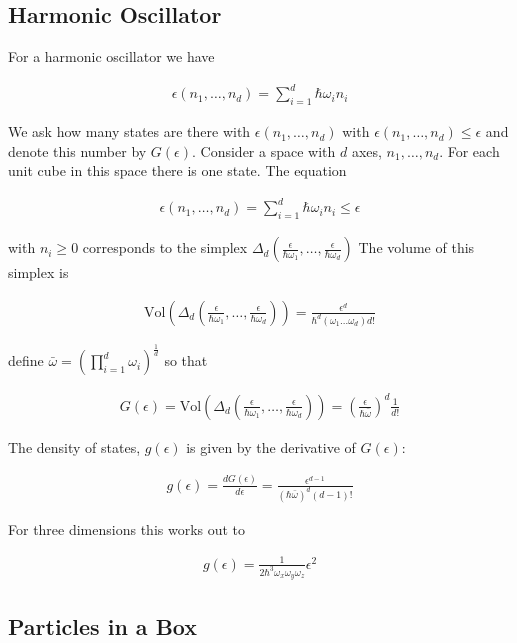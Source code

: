\documentclass[12pt]{article}
\newcommand{\ep}{\epsilon}
\begin{document}
\subsection{Harmonic Oscillator}
For a harmonic oscillator we have

\begin{align}
\ep(n_1,\ldots,n_d) = \sum_{i=1}^d \hbar \omega_i n_i
\end{align}

We ask how many states are there with $\ep(n_1, \ldots, n_d)$ with $\ep(n_1, \ldots, n_d) \le \ep$ and denote this number by $G(\ep)$. Consider a space with $d$ axes, $n_1,\ldots, n_d$. For each unit cube in this space there is one state. The equation

\begin{align}
\ep(n_1, \ldots, n_d) = \sum_{i=1}^d \hbar \omega_i n_i \le \ep
\end{align}

with $n_i \ge 0$ corresponds to the simplex $\Delta_d\left(\frac{\ep}{\hbar \omega_1},\ldots,\frac{\ep}{\hbar \omega_d} \right)$ The volume of this simplex is

\begin{align}
\text{Vol}\left(\Delta_d\left(\frac{\ep}{\hbar \omega_1},\ldots,\frac{\ep}{\hbar \omega_d} \right) \right) = \frac{\ep^d}{\hbar^d (\omega_1\ldots \omega_d) d!}
\end{align}

define $\bar{\omega} = \left(\prod_{i=1}^d \omega_i\right)^{\frac{1}{d}}$ so that

\begin{align}
G(\ep) = \text{Vol}\left(\Delta_d\left(\frac{\ep}{\hbar \omega_1},\ldots,\frac{\ep}{\hbar \omega_d} \right) \right) = \left(\frac{\ep}{\hbar \bar{\omega}}\right)^d \frac{1}{d!}
\end{align}

The density of states, $g(\ep)$ is given by the derivative of $G(\ep)$:

\begin{align}
g(\ep) = \frac{dG(\ep)}{d\ep} = \frac{\ep^{d-1}}{(\hbar \bar{\omega})^d (d-1)!}
\end{align}

For three dimensions this works out to

\begin{align}
g(\ep) = \frac{1}{2\hbar^3\omega_x\omega_y\omega_z} \ep^2
\end{align}

\subsection{Particles in a Box}
\end{document}
